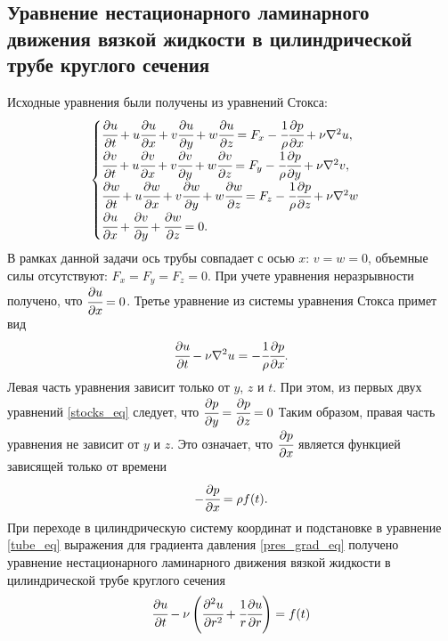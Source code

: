 \documentclass[12pt]{article}
\begin{document}
\subsection{Уравнение нестационарного ламинарного движения вязкой жидкости в цилиндрической трубе круглого сечения}
Исходные уравнения были получены из уравнений Стокса:
\begin{equation}
\label{stocks_eq}
\begin{cases}
\cfrac{\partial u}{\partial t}+u\cfrac{\partial u}{\partial x}+v\cfrac{\partial u}{\partial y}+w\cfrac{\partial u}{\partial z}=F_x-\cfrac{1}{\rho}\cfrac{\partial p}{\partial x}+\nu\nabla^2u,\\
\cfrac{\partial v}{\partial t}+u\cfrac{\partial v}{\partial x}+v\cfrac{\partial v}{\partial y}+w\cfrac{\partial v}{\partial z}=F_y-\cfrac{1}{\rho}\cfrac{\partial p}{\partial y}+\nu\nabla^2v,\\
\cfrac{\partial w}{\partial t}+u\cfrac{\partial w}{\partial x}+v\cfrac{\partial w}{\partial y}+w\cfrac{\partial w}{\partial z}=F_z-\cfrac{1}{\rho}\cfrac{\partial p}{\partial z}+\nu\nabla^2w\\
\cfrac{\partial u}{\partial x}+\cfrac{\partial v}{\partial y}+\cfrac{\partial w}{\partial z}=0.
\end{cases}
\end{equation}
В рамках данной задачи ось трубы совпадает с осью $x$: $v=w=0$, объемные силы отсутствуют: $F_x=F_y=F_z=0$. При учете уравнения неразрывности получено, что $\cfrac{\partial u}{\partial x}=0$. Третье уравнение из системы уравнения Стокса примет вид
\begin{equation}
\label{tube_eq}
\cfrac{\partial u}{\partial t}-\nu\nabla^2u=-\cfrac{1}{\rho}\cfrac{\partial p}{\partial x}.
\end{equation}
Левая часть уравнения зависит только от $y$, $z$ и $t$.
При этом, из первых двух уравнений \eqref{stocks_eq} следует, что $\cfrac{\partial p}{\partial y}=\cfrac{\partial p}{\partial z}=0$
Таким образом, правая часть уравнения не зависит от $y$ и $z$. Это означает, что $\cfrac{\partial p}{\partial x}$ является функцией зависящей только от времени
\begin{equation}
\label{pres_grad_eq}
-\cfrac{\partial p}{\partial x}=\rho f(t).
\end{equation}
При переходе в цилиндрическую систему координат и подстановке в уравнение  \eqref{tube_eq} выражения для градиента давления \eqref{pres_grad_eq} получено уравнение нестационарного ламинарного движения вязкой жидкости в цилиндрической трубе круглого сечения
\begin{equation}
\label{tube_cylindric_eq}
\cfrac{\partial u}{\partial t}-\nu\left(\cfrac{\partial^2u}{\partial r^2}+\cfrac{1}{r}\cfrac{\partial u}{\partial r}\right)=f(t)
\end{equation}
\end{document}
